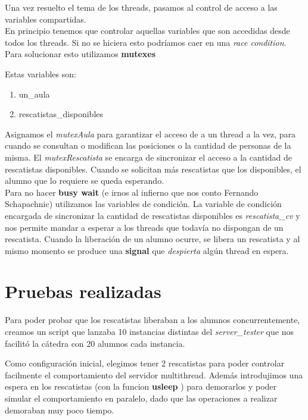 \documentclass[a4paper, 10pt]{article}
\begin{document}
Una vez resuelto el tema de los threads, pasamos al control de acceso a las variables compartidas.\\ 
En principio tenemos que controlar aquellas variables que son accedidas desde todos los threads. Si no se hiciera esto podr\'iamos caer en una \textit{race condition}. \\
\newline
Para solucionar esto utilizamos \textbf{mutexes}

Estas variables son:
\begin{enumerate}
    \item un\_aula
    \item rescatistas\_disponibles
\end{enumerate}

Asignamos el \textit{mutexAula} para garantizar el acceso de a un thread a la vez, para cuando se consultan o modifican las posiciones o la cantidad de personas de la misma.
El \textit{mutexRescatista} se encarga de sincronizar el acceso a la cantidad de rescatistas disponibles.
Cuando se solicitan m\'as rescatistas que los disponibles, el alumno que lo requiere se queda esperando.\\ 
Para no hacer \textbf{busy wait} (e irnos al infierno que nos conto Fernando Schapachnic) utilizamos las variables de condici\'on.
La variable de condici\'on encargada de sincronizar la cantidad de rescatistas disponibles es \textit{rescatista\_cv} y nos permite mandar a esperar a los threads que todav\'ia no dispongan de un rescatista. Cuando la liberaci\'on de un alumno ocurre, se libera un rescatista y al mismo momento se produce una \textbf{signal} que \textit{despierta} alg\'un thread en espera.

\newpage

\section{Pruebas realizadas}
Para poder probar que los rescatistas liberaban a los alumnos concurrentemente, creamos un script que lanzaba 10 instancias distintas del \textit{server\_tester} que nos facilit\'o la c\'atedra con 20 alumnos cada instancia.

Como configuraci\'on inicial, elegimos tener 2 rescatistas para poder controlar facilmente el comportamiento del servidor multithread. Adem\'as introdujimos una espera en los rescatistas (con la funcion \textbf{usleep} ) para demorarlos y poder simular el comportamiento en paralelo, dado que las operaciones a realizar demoraban muy poco tiempo.\\
\end{document}
